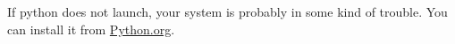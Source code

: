 If python does not launch, your system is probably in some kind of trouble.
You can install it from \href{http://www.python.org/getit/mac/}{Python.org}.
